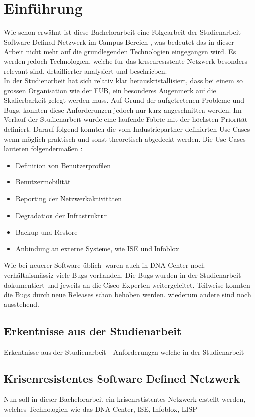 \section{Einführung}

Wie schon erwähnt ist diese Bachelorarbeit eine Folgearbeit der Studienarbeit Software-Defined Netzwerk im Campus Bereich \cite{studienarbeit}, was bedeutet das in dieser Arbeit nicht mehr auf die grundlegenden Technologien eingegangen wird. Es werden jedoch Technologien, welche für das krisenresistente Netzwerk besonders relevant sind, detaillierter analysiert und beschrieben. \\

In der Studienarbeit hat sich relativ klar herauskristallisiert, dass bei einem so grossen Organisation wie der FUB, ein besonderes Augenmerk auf die Skalierbarkeit gelegt werden muss. Auf Grund der aufgetretenen Probleme und Bugs, konnten diese Anforderungen jedoch nur kurz angeschnitten werden. Im Verlauf der Studienarbeit wurde eine laufende Fabric mit der höchsten Priorität definiert. Darauf folgend konnten die vom Industriepartner definierten Use Cases wenn möglich praktisch und sonst theoretisch abgedeckt werden. Die Use Cases lauteten folgendermaßen \cite{studienarbeit}:

\begin{itemize}
	\item Definition von Benutzerprofilen
	\item Benutzermobilität
	\item Reporting der Netzwerkaktivitäten
	\item Degradation der Infrastruktur
	\item Backup und Restore
	\item Anbindung an externe Systeme, wie ISE und Infoblox
\end{itemize}

Wie bei neuerer Software üblich, waren auch in DNA Center noch verhältnismässig viele
Bugs vorhanden. Die Bugs wurden in der Studienarbeit dokumentiert und jeweils an die Cisco
Experten weitergeleitet. Teilweise konnten die Bugs durch neue Releases schon behoben werden, wiederum andere sind noch ausstehend.

\subsection{Erkentnisse aus der Studienarbeit}
Erkentnisse aus der Studienarbeit - Anforderungen welche in der Studienarbeit


\subsection{Krisenresistentes Software Defined Netzwerk}
Nun soll in dieser Bachelorarbeit ein krisenrstistentes Netzwerk erstellt werden, welches Technologien wie das DNA Center, ISE, Infoblox, LISP






